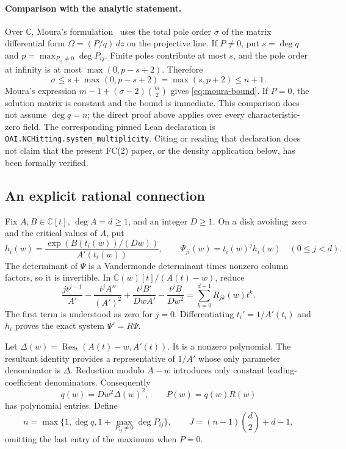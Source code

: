 \documentclass[11pt]{article}
\numberwithin{equation}{section}
\theoremstyle{definition}\newtheorem{definition}[theorem]{Definition}
\theoremstyle{remark}\newtheorem{remark}[theorem]{Remark}
\newcommand{\C}{\mathbb C}
\newcommand{\dd}{\,d}
\newcommand{\Res}{\operatorname{Res}}
\begin{document}
\paragraph{Comparison with the analytic statement.}
Over $\C$, Moura's formulation~\cite[Section~2, Theorem~1]{MouraHyper}
uses the total pole order $\sigma$ of the matrix differential form
$\Omega=(P/q)\dd z$ on the projective line. If $P\ne0$, put
$s=\deg q$ and $p=\max_{P_{ij}\ne0}\deg P_{ij}$. Finite poles contribute
at most $s$, and the pole order at infinity is at most
$\max(0,p-s+2)$. Therefore
\[
 \sigma\le s+\max(0,p-s+2)=\max(s,p+2)\le n+1.
\]
Moura's expression $m-1+(\sigma-2)\binom m2$ gives
\eqref{eq:moura-bound}. If $P=0$, the solution matrix is constant and
the bound is immediate. This comparison does not assume $\deg q=n$;
the direct proof above applies over every characteristic-zero field.
The corresponding pinned Lean declaration is
\texttt{OAI.NCHitting.}\allowbreak\texttt{system\_multiplicity}.
Citing or reading that declaration does not claim that the present
FC(2) paper, or the density application below, has been formally verified.

\subsection{An explicit rational connection}
Fix $A,B\in\C[t]$, $\deg A=d\ge1$, and an integer $D\ge1$.
On a disk avoiding zero and the critical values of $A$, put
\[
 h_i(w)=\frac{\exp(B(t_i(w))/(Dw))}{A'(t_i(w))},\qquad
 \Psi_{ji}(w)=t_i(w)^j h_i(w)\quad(0\le j<d).
\]
The determinant of $\Psi$ is a Vandermonde determinant times nonzero
column factors, so it is invertible. In $\C(w)[t]/(A(t)-w)$, reduce
\begin{equation}\label{eq:density-connection}
 \frac{j t^{j-1}}{A'}-\frac{t^jA''}{(A')^2}
 +\frac{t^jB'}{DwA'}-\frac{t^jB}{Dw^2}
       =\sum_{k=0}^{d-1}R_{jk}(w)t^k.
\end{equation}
The first term is understood as zero for $j=0$.
Differentiating $t_i'=1/A'(t_i)$ and $h_i$ proves the exact system
$\Psi'=R\Psi$.

Let $\Delta(w)=\Res_t(A(t)-w,A'(t))$. It is a nonzero polynomial.
The resultant identity provides a representative of $1/A'$ whose
only parameter denominator is $\Delta$. Reduction modulo $A-w$
introduces only constant leading-coefficient denominators. Consequently
\[
 q(w)=Dw^2\Delta(w)^2,\qquad P(w)=q(w)R(w)
\]
has polynomial entries. Define
\[
 n=\max\{1,\deg q,1+\max_{P_{ij}\ne0}\deg P_{ij}\},\qquad
 J=(n-1)\binom d2+d-1,
\]
omitting the last entry of the maximum when $P=0$.
\end{document}
